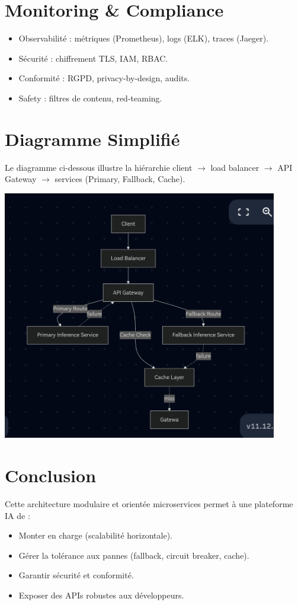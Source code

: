 \documentclass[12pt,a4paper]{report}
\begin{document}
\chapter{Monitoring \& Compliance}
\begin{itemize}
    \item Observabilité : métriques (Prometheus), logs (ELK), traces (Jaeger).  
    \item Sécurité : chiffrement TLS, IAM, RBAC.  
    \item Conformité : RGPD, privacy-by-design, audits.  
    \item Safety : filtres de contenu, red-teaming.  
\end{itemize}

\chapter{Diagramme Simplifié}
Le diagramme ci-dessous illustre la hiérarchie client $\rightarrow$ load balancer $\rightarrow$ API Gateway $\rightarrow$ services (Primary, Fallback, Cache).

\begin{center}
    \includegraphics[width=0.9\textwidth]{mermaid.jpg}
\end{center}

\chapter{Conclusion}
Cette architecture modulaire et orientée microservices permet à une plateforme IA de :
\begin{itemize}
    \item Monter en charge (scalabilité horizontale).  
    \item Gérer la tolérance aux pannes (fallback, circuit breaker, cache).  
    \item Garantir sécurité et conformité.  
    \item Exposer des APIs robustes aux développeurs.  
\end{itemize}
\end{document}
